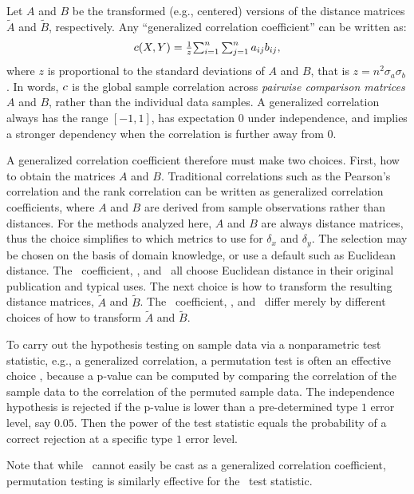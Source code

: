 \documentclass[11pt]{article}
\begin{document}
Let $A$ and $B$ be the transformed (e.g., centered) versions of the distance matrices $\tilde{A}$ and $\tilde{B}$, respectively. Any ``generalized correlation coefficient''  \cite{Spearman1904,KendallBook} can be written as:
\begin{equation}
\label{generalCoef}
c(X,Y)= \tfrac{1}{z} {\textstyle \sum_{i=1}^n \sum_{j=1}^n a_{ij} b_{ij}},
\end{equation}
where $z$ is proportional to the standard deviations of $A$ and $B$, that is $z=n^2\sigma_a \sigma_b$.
In words, $c$ is the global sample correlation across \emph{pairwise comparison matrices} $A$ and $B$, rather than the individual data samples. 
A generalized correlation always has the range $[-1,1]$, has expectation $0$ under independence, and implies a stronger dependency when the correlation is further away from $0$. 

A generalized correlation coefficient therefore must make two choices. First, how to obtain the matrices $A$ and $B$.  Traditional correlations such as the Pearson's correlation and the rank correlation can be written as generalized correlation coefficients, where $A$ and $B$ are derived from sample observations rather than distances. For the methods analyzed here, $A$ and $B$ are always distance matrices, thus the choice simplifies to  which metrics to use for $\delta_x$ and $\delta_y$.  The selection may be chosen on the basis of domain knowledge, or use a default such as Euclidean distance.  The \Mantel~coefficient, \Dcorr, and \Mcorr~all choose Euclidean distance in their original publication and typical uses.
The next choice is how to transform the resulting distance matrices, $\tilde{A}$ and $\tilde{B}$.  
The \Mantel~coefficient, \Dcorr, and \Mcorr~differ merely by different choices of how to transform $\tilde{A}$ and $\tilde{B}$.  

To carry out the hypothesis testing on sample data via a nonparametric test statistic, e.g., a generalized correlation, a permutation test is often an effective choice \cite{GoodPermutationBook}, because a p-value can be computed by comparing the correlation of the sample data to the correlation of the permuted sample data. The independence hypothesis is rejected if the p-value is lower than a pre-determined type $1$ error level, say $0.05$. Then the power of the test statistic equals the probability of a correct rejection at a specific type $1$ error level.

Note that while \Hhg~cannot easily be cast as a generalized correlation coefficient, permutation testing is similarly effective for the \Hhg~test statistic. 
\end{document}
